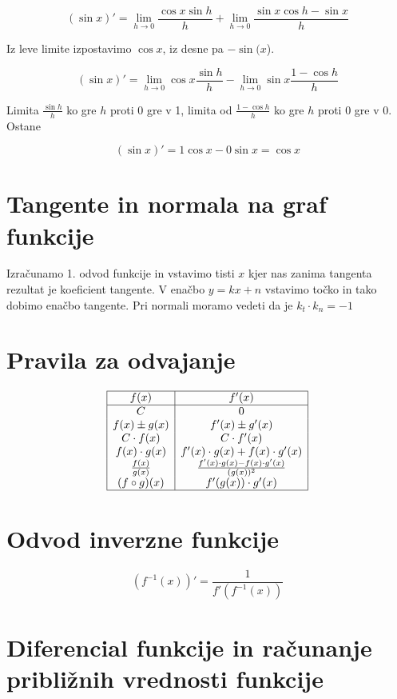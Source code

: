 \documentclass[12pt]{report}
\begin{document}
 \[(\sin x)'=\lim_{h \to 0}\frac{\cos x \sin h}{h} + \lim_{h \to 0}\frac{\sin x \cos h -\sin x}{h}\]
 
Iz leve limite izpostavimo $\cos x$, iz desne pa $-\sin(x$).
 
 \[(\sin x)'=\lim_{h \to 0}\cos x \frac{\sin h}{h} - \lim_{h \to 0}\sin x\frac{1- \cos h}{h}\]
 
Limita $\frac{\sin h}{h}$ ko gre $h$ proti 0 gre v 1, limita od $\frac{1- \cos h}{h}$ ko gre $h$ proti 0 gre v 0. Ostane

 
 \[(\sin x)'=1\cos x - 0\sin x= \cos x\]
 

\section*{Tangente in normala na graf funkcije}
Izračunamo 1. odvod funkcije in vstavimo tisti $x$ kjer nas zanima tangenta rezultat je koeficient tangente. V enačbo $y = kx+n$ vstavimo točko in tako dobimo enačbo tangente.
Pri normali moramo vedeti da je $k_t \cdot k_n = -1$

\section*{Pravila za odvajanje}


\begin{tabela}[H]
  \centering
  \[
      \begin{array}{|c|c|} \hline
      f(x)&f'(x)\\ \hline 
    C &   0 \\
	f(x) \pm g(x) &   f'(x) \pm g'(x) \\
	C \cdot f(x) &  C \cdot f'(x)  \\
	f(x) \cdot g(x) & f'(x)\cdot g(x) +  f(x)\cdot g'(x)  \\
	\frac{f(x)}{g(x)} &  \frac{f'(x)\cdot g(x) -  f(x)\cdot g'(x)}{(g(x))^2}  \\
	(f \circ g)(x) &   f'(g(x)) \cdot g'(x)  \\ \hline
    \end{array}
  \]
\end{tabela}

\section*{Odvod inverzne funkcije}

\[(f^{-1}(x))'=\frac{1}{f'(f^{-1}(x))}\]
 
\section*{Diferencial funkcije in računanje približnih vrednosti funkcije}
 
\end{document}
